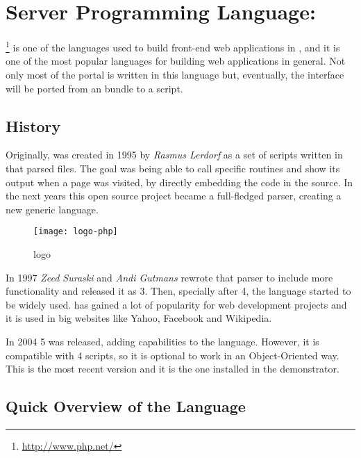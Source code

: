 \section{Server Programming Language: } %
\label{sec:php}

\footnote{\url{http://www.php.net/}} is one of the languages used to build front-end web applications in , and it is one of the most popular languages for building web applications in general.
Not only most of the portal is written in this language but, eventually, the  interface will be ported from an  bundle to a  script.

\subsection{History} %
\label{sub:phphistory}

Originally,  was created in 1995 by \emph{Rasmus Lerdorf} as a set of  scripts written in  that parsed  files.
The goal was being able to call specific  routines and show its output when a page was visited, by directly embedding the code in the  source.
In the next years this open source project became a full-fledged parser, creating a new generic language.

\begin{wrapfigure}{r}{0.5\textwidth}
  \centering
    \texttt{[image: logo-php]}
  \caption{ logo}
  \label{fig:logo-php}
\end{wrapfigure}

In 1997 \emph{Zeed Suraski} and \emph{Andi Gutmans} rewrote that parser to include more functionality and released it as  3.
Then, specially after  4, the language started to be widely used.
 has gained a lot of popularity for web development projects and it is used in big websites like Yahoo, Facebook and Wikipedia.

In 2004  5 was released, adding  capabilities to the language.
However, it is compatible with  4 scripts, so it is optional to work in an Object-Oriented way.
This is the most recent version and it is the one installed in the  demonstrator.


\subsection{Quick Overview of the Language} %
\label{sub:overviewphp}

